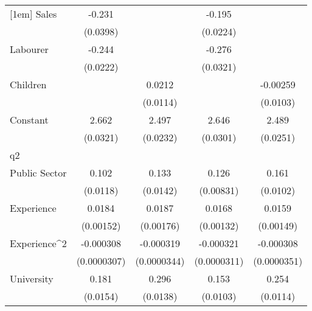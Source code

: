 {\begin{tabular}{l*{4}{c}}
[1em]
Sales               &      -0.231\sym{***}&                     &      -0.195\sym{***}&                     \\
                    &    (0.0398)         &                     &    (0.0224)         &                     \\
[1em]
Labourer            &      -0.244\sym{***}&                     &      -0.276\sym{***}&                     \\
                    &    (0.0222)         &                     &    (0.0321)         &                     \\
[1em]
Children            &                     &      0.0212         &                     &    -0.00259         \\
                    &                     &    (0.0114)         &                     &    (0.0103)         \\
[1em]
Constant            &       2.662\sym{***}&       2.497\sym{***}&       2.646\sym{***}&       2.489\sym{***}\\
                    &    (0.0321)         &    (0.0232)         &    (0.0301)         &    (0.0251)         \\
\hline
q2                  &                     &                     &                     &                     \\
Public Sector       &       0.102\sym{***}&       0.133\sym{***}&       0.126\sym{***}&       0.161\sym{***}\\
                    &    (0.0118)         &    (0.0142)         &   (0.00831)         &    (0.0102)         \\
[1em]
Experience          &      0.0184\sym{***}&      0.0187\sym{***}&      0.0168\sym{***}&      0.0159\sym{***}\\
                    &   (0.00152)         &   (0.00176)         &   (0.00132)         &   (0.00149)         \\
[1em]
Experience^{2}      &   -0.000308\sym{***}&   -0.000319\sym{***}&   -0.000321\sym{***}&   -0.000308\sym{***}\\
                    & (0.0000307)         & (0.0000344)         & (0.0000311)         & (0.0000351)         \\
[1em]
University          &       0.181\sym{***}&       0.296\sym{***}&       0.153\sym{***}&       0.254\sym{***}\\
                    &    (0.0154)         &    (0.0138)         &    (0.0103)         &    (0.0114)         \\

\end{tabular}}

